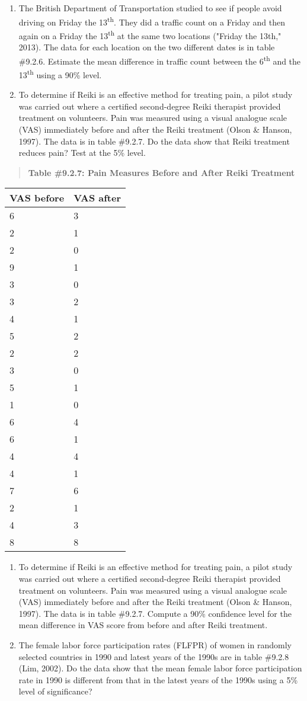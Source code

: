 \documentclass[]{book}
\begin{document}
\begin{enumerate}
\def\labelenumi{\arabic{enumi}.}
\setcounter{enumi}{5}
\item
  The British Department of Transportation studied to see if people avoid driving on Friday the 13\textsuperscript{th}. They did a traffic count on a Friday and then again on a Friday the 13\textsuperscript{th} at the same two locations ("Friday the 13th," 2013). The data for each location on the two different dates is in table \#9.2.6. Estimate the mean difference in traffic count between the 6\textsuperscript{th} and the 13\textsuperscript{th} using a 90\% level.
\item
  To determine if Reiki is an effective method for treating pain, a pilot study was carried out where a certified second-degree Reiki therapist provided treatment on volunteers. Pain was measured using a visual analogue scale (VAS) immediately before and after the Reiki treatment (Olson \& Hanson, 1997). The data is in table \#9.2.7. Do the data show that Reiki treatment reduces pain? Test at the 5\% level.
\end{enumerate}

\begin{quote}
\textbf{Table \#9.2.7: Pain Measures Before and After Reiki Treatment}
\end{quote}

\begin{longtable}[]{@{}ll@{}}
\toprule
VAS before & VAS after\tabularnewline
\midrule
\endhead
6 & 3\tabularnewline
2 & 1\tabularnewline
2 & 0\tabularnewline
9 & 1\tabularnewline
3 & 0\tabularnewline
3 & 2\tabularnewline
4 & 1\tabularnewline
5 & 2\tabularnewline
2 & 2\tabularnewline
3 & 0\tabularnewline
5 & 1\tabularnewline
1 & 0\tabularnewline
6 & 4\tabularnewline
6 & 1\tabularnewline
4 & 4\tabularnewline
4 & 1\tabularnewline
7 & 6\tabularnewline
2 & 1\tabularnewline
4 & 3\tabularnewline
8 & 8\tabularnewline
\bottomrule
\end{longtable}

\begin{enumerate}
\def\labelenumi{\arabic{enumi}.}
\setcounter{enumi}{7}
\item
  To determine if Reiki is an effective method for treating pain, a pilot study was carried out where a certified second-degree Reiki therapist provided treatment on volunteers. Pain was measured using a visual analogue scale (VAS) immediately before and after the Reiki treatment (Olson \& Hanson, 1997). The data is in table \#9.2.7. Compute a 90\% confidence level for the mean difference in VAS score from before and after Reiki treatment.
\item
  The female labor force participation rates (FLFPR) of women in randomly selected countries in 1990 and latest years of the 1990s are in table \#9.2.8 (Lim, 2002). Do the data show that the mean female labor force participation rate in 1990 is different from that in the latest years of the 1990s using a 5\% level of significance?
\end{enumerate}
\end{document}
